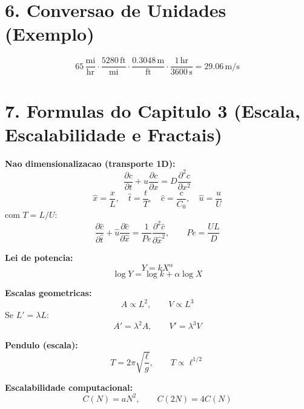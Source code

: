 \documentclass[12pt,a4paper]{article}
\begin{document}
\section*{6. Conversao de Unidades (Exemplo)}
\begin{equation}
65\,\frac{\text{mi}}{\text{hr}}
\cdot \frac{5280\,\text{ft}}{\text{mi}}
\cdot \frac{0.3048\,\text{m}}{\text{ft}}
\cdot \frac{1\,\text{hr}}{3600\,\text{s}}
= 29.06\,\text{m/s}
\end{equation}

\section*{7. Formulas do Capitulo 3 (Escala, Escalabilidade e Fractais)}

\textbf{Nao dimensionalizacao (transporte 1D):}
\begin{equation}
\frac{\partial c}{\partial t} + u\frac{\partial c}{\partial x} = D\frac{\partial^2 c}{\partial x^2}
\end{equation}
\begin{equation}
\hat{x}=\frac{x}{L},\quad \hat{t}=\frac{t}{T},\quad \hat{c}=\frac{c}{C_0},\quad \hat{u}=\frac{u}{U}
\end{equation}
com $T=L/U$:
\begin{equation}
\frac{\partial \hat{c}}{\partial \hat{t}} + \hat{u}\frac{\partial \hat{c}}{\partial \hat{x}}
= \frac{1}{Pe}\frac{\partial^2 \hat{c}}{\partial \hat{x}^2},
\qquad
Pe=\frac{UL}{D}
\end{equation}

\textbf{Lei de potencia:}
\begin{equation}
Y = kX^{\alpha}
\end{equation}
\begin{equation}
\log Y = \log k + \alpha\log X
\end{equation}

\textbf{Escalas geometricas:}
\begin{equation}
A \propto L^2,\qquad V \propto L^3
\end{equation}
Se $L' = \lambda L$:
\begin{equation}
A' = \lambda^2 A,\qquad V' = \lambda^3 V
\end{equation}

\textbf{Pendulo (escala):}
\begin{equation}
T = 2\pi\sqrt{\frac{\ell}{g}},
\qquad
T\propto \ell^{1/2}
\end{equation}

\textbf{Escalabilidade computacional:}
\begin{equation}
C(N) = aN^2,
\qquad
C(2N)=4C(N)
\end{equation}
\end{document}
